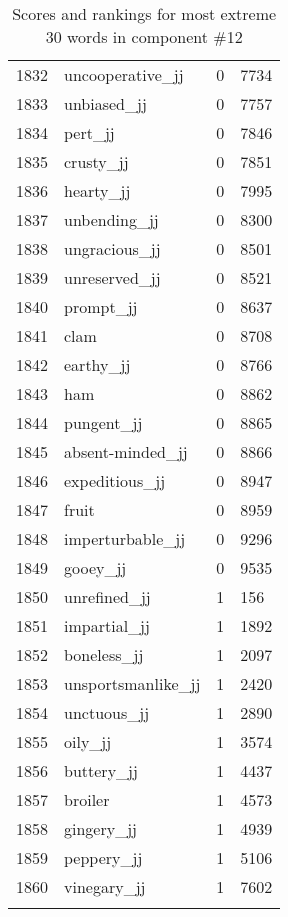 \begin{longtable}[!htbp]{| rlr@{.}l |}
    1832 & uncooperative\_jj & 0 & 7734 \\
    1833 & unbiased\_jj & 0 & 7757 \\
    1834 & pert\_jj & 0 & 7846 \\
    1835 & crusty\_jj & 0 & 7851 \\
    1836 & hearty\_jj & 0 & 7995 \\
    1837 & unbending\_jj & 0 & 8300 \\
    1838 & ungracious\_jj & 0 & 8501 \\
    1839 & unreserved\_jj & 0 & 8521 \\
    1840 & prompt\_jj & 0 & 8637 \\
    1841 & clam & 0 & 8708 \\
    1842 & earthy\_jj & 0 & 8766 \\
    1843 & ham & 0 & 8862 \\
    1844 & pungent\_jj & 0 & 8865 \\
    1845 & absent-minded\_jj & 0 & 8866 \\
    1846 & expeditious\_jj & 0 & 8947 \\
    1847 & fruit & 0 & 8959 \\
    1848 & imperturbable\_jj & 0 & 9296 \\
    1849 & gooey\_jj & 0 & 9535 \\
    1850 & unrefined\_jj & 1 & 156 \\
    1851 & impartial\_jj & 1 & 1892 \\
    1852 & boneless\_jj & 1 & 2097 \\
    1853 & unsportsmanlike\_jj & 1 & 2420 \\
    1854 & unctuous\_jj & 1 & 2890 \\
    1855 & oily\_jj & 1 & 3574 \\
    1856 & buttery\_jj & 1 & 4437 \\
    1857 & broiler & 1 & 4573 \\
    1858 & gingery\_jj & 1 & 4939 \\
    1859 & peppery\_jj & 1 & 5106 \\
    1860 & vinegary\_jj & 1 & 7602 \\
    \hline
    \caption{Scores and rankings for most extreme 30 words in component \#12} \\
\end{longtable}
